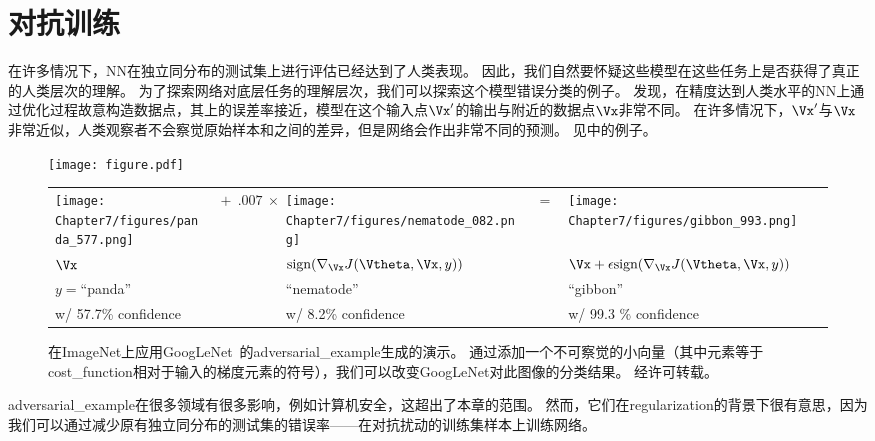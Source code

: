 \section{对抗训练}
\label{sec:adversarial_training}
在许多情况下，\gls{NN}在独立同分布的测试集上进行评估已经达到了人类表现。
因此，我们自然要怀疑这些模型在这些任务上是否获得了真正的人类层次的理解。
为了探索网络对底层任务的理解层次，我们可以探索这个模型错误分类的例子。
\cite{Szegedy-ICLR2014}发现，在精度达到人类水平的\gls{NN}上通过优化过程故意构造数据点，其上的误差率接近，模型在这个输入点$\Vx'$的输出与附近的数据点$\Vx$非常不同。
在许多情况下，$\Vx'$与$\Vx$非常近似，人类观察者不会察觉原始样本和之间的差异，但是网络会作出非常不同的预测。
见中的例子。
\begin{figure}[!htb]
\ifOpenSource
\centerline{\texttt{[image: figure.pdf]}}
\else
\centering
\begin{tabular}{>{\centering\arraybackslash}m{.2\figwidth}m{.5in}>{\centering\arraybackslash}m{.2\figwidth}m{.1in}>{\centering\arraybackslash}m{.2\figwidth}}
    \centering\arraybackslash
    \texttt{[image: Chapter7/figures/panda\_577.png]} &%
    \centering\arraybackslash%
$\ +\ .007\ \times$ &%
    \texttt{[image: Chapter7/figures/nematode\_082.png]} &%
    $=$ & %
    \texttt{[image: Chapter7/figures/gibbon\_993.png]} \\
    $\centering \Vx$     &%
    & $\text{sign} (\nabla_{\Vx} J(\Vtheta, \Vx, y) )$ & & $\Vx + \epsilon \text{sign} (\nabla_{\Vx} J(\Vtheta, \Vx, y) )$ \\
    $y=$``panda'' &                & ``nematode''     &   & ``gibbon'' \\
    w/ 57.7\% confidence &        &   w/ 8.2\% confidence & & w/ 99.3 \% confidence
\end{tabular}    
\fi
\caption[Fast adversarial sample generation]{
在ImageNet上应用GoogLeNet~\citep{Szegedy-et-al-arxiv2014}的\gls{adversarial_example}生成的演示。
通过添加一个不可察觉的小向量（其中元素等于\gls{cost_function}相对于输入的梯度元素的符号），我们可以改变GoogLeNet对此图像的分类结果。
经\citet{Goodfellow-2015-adversarial}许可转载。
}
\label{fig:chap7_panda_577}
\end{figure}


\gls{adversarial_example}在很多领域有很多影响，例如计算机安全，这超出了本章的范围。
然而，它们在\gls{regularization}的背景下很有意思，因为我们可以通过减少原有独立同分布的测试集的错误率——在对抗扰动的训练集样本上训练网络\citep{Szegedy-ICLR2014,Goodfellow-2015-adversarial}。


